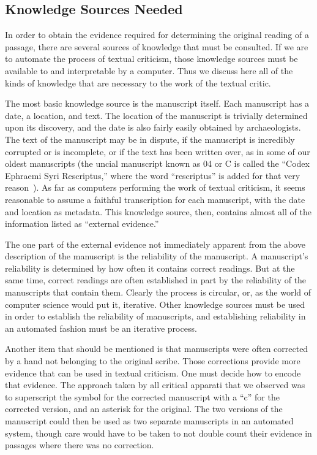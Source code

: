 \documentclass[onecolumn, 12pt]{article}
\begin{document}
\subsection{Knowledge Sources Needed}

In order to obtain the evidence required for determining the original reading
of a passage, there are several sources of knowledge that must be consulted.
If we are to automate the process of textual criticism, those knowledge sources
must be available to and interpretable by a computer.  Thus we discuss here all
of the kinds of knowledge that are necessary to the work of the textual critic.

The most basic knowledge source is the manuscript itself.  Each manuscript has
a date, a location, and text.  The location of the manuscript is trivially
determined upon its discovery, and the date is also fairly easily obtained by
archaeologists.  The text of the manuscript may be in dispute, if the
manuscript is incredibly corrupted or is incomplete, or if the text has been
written over, as in some of our oldest manuscripts (the uncial manuscript known
as 04 or C is called the ``Codex Ephraemi Syri Rescriptus,'' where the word
``rescriptus'' is added for that very
reason~\cite[109]{aland-text-of-the-new-testament}).  As far as computers
performing the work of textual criticism, it seems reasonable to assume a
faithful transcription for each manuscript, with the date and location as
metadata.  This knowledge source, then, contains almost all of the information
listed as ``external evidence.''

The one part of the external evidence not immediately apparent from the above
description of the manuscript is the reliability of the manuscript.  A
manuscript's reliability is determined by how often it contains correct
readings.  But at the same time, correct readings are often established in part
by the reliability of the manuscripts that contain them.  Clearly the process
is circular, or, as the world of computer science would put it, iterative.
Other knowledge sources must be used in order to establish the reliability of
manuscripts, and establishing reliability in an automated fashion must be an
iterative process.

Another item that should be mentioned is that manuscripts were often corrected
by a hand not belonging to the original scribe.  Those corrections provide more
evidence that can be used in textual criticism.  One must decide how to encode
that evidence.  The approach taken by all critical apparati that we observed
was to superscript the symbol for the corrected manuscript with a ``c'' for the
corrected version, and an asterisk for the original.  The two versions of the
manuscript could then be used as two separate manuscripts in an automated
system, though care would have to be taken to not double count their evidence
in passages where there was no correction.
\end{document}
